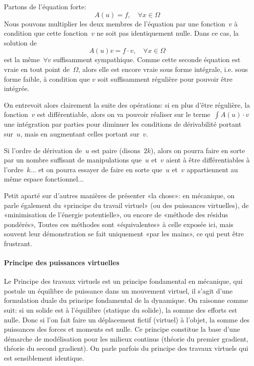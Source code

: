 Partons de l'équation forte:
\begin{equation}A(u)=f,\quad \forall x\in\Omega\end{equation}
Nous pouvons multiplier les deux membres de l'équation par une fonction~$v$ à condition que cette fonction~$v$ ne soit pas identiquement nulle. Dans ce cas, la solution de 
\begin{equation}A(u)v=f\cdot v,\quad \forall x\in\Omega\end{equation} 
est la même~$\forall v$ suffisamment sympathique.
Comme cette seconde équation est vraie en tout point de~$\Omega$, alors elle est encore vraie sous forme intégrale, i.e. sous forme faible, à condition que $v$ soit suffisamment régulière pour pouvoir être intégrée.

On entrevoit alors clairement la suite des opérations: si en plus d'être régulière, la fonction~$v$ est différentiable, alors on va pouvoir réaliser sur le terme~$\int A(u)\cdot v$ une intégration par parties pour diminuer les conditions de dérivabilité portant sur~$u$, mais en augmentant celles portant sur~$v$.

Si l'ordre de dérivation de~$u$ est paire (disons~$2k$), alors on pourra faire en sorte par un nombre suffisant de manipulations que~$u$ et~$v$ aient à être différentiables à l'ordre~$k$... et on pourra essayer de faire en sorte que~$u$ et~$v$ appartiennent au même espace fonctionnel...

\medskip
{}
Petit aparté sur d'autres manières de présenter «la chose»: en mécanique, on parle également du «principe du travail virtuel» (ou des puissances virtuelles), de «minimisation de l'énergie potentielle», ou encore de «méthode des résidus pondérés»,
Toutes ces méthodes sont «équivalentes» à celle exposée ici, mais souvent leur démonstration se fait uniquement «par les mains», ce qui peut être frustrant.

\medskip
\paragraph{Principe des puissances virtuelles}
Le Principe des travaux virtuels est un principe fondamental en mécanique, qui postule un équilibre de puissance dans un mouvement virtuel, il s'agit d'une formulation duale du principe fondamental de la dynamique. On raisonne comme suit: si un solide est à l'équilibre (statique du solide), la somme des efforts est nulle. Donc si l'on fait faire un déplacement fictif (virtuel) à l'objet, la somme des puissances des forces et moments est nulle. Ce principe constitue la base d'une démarche de modélisation pour les milieux continus (théorie du premier gradient, théorie du second gradient). On parle parfois du principe des travaux virtuels qui est sensiblement identique.




